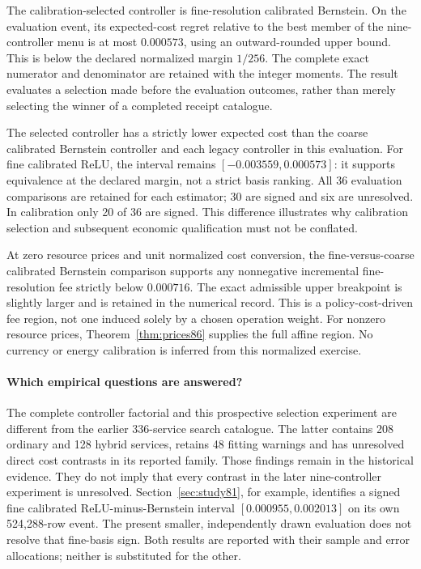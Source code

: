 

The calibration-selected controller is fine-resolution calibrated Bernstein. On the evaluation event, its expected-cost regret relative to the best member of the nine-controller menu is at most $0.000573$, using an outward-rounded upper bound. This is below the declared normalized margin $1/256$. The complete exact numerator and denominator are retained with the integer moments. The result evaluates a selection made before the evaluation outcomes, rather than merely selecting the winner of a completed receipt catalogue.

The selected controller has a strictly lower expected cost than the coarse calibrated Bernstein controller and each legacy controller in this evaluation. For fine calibrated ReLU, the interval remains $[-0.003559,0.000573]$: it supports equivalence at the declared margin, not a strict basis ranking. All 36 evaluation comparisons are retained for each estimator; 30 are signed and six are unresolved. In calibration only 20 of 36 are signed. This difference illustrates why calibration selection and subsequent economic qualification must not be conflated.

At zero resource prices and unit normalized cost conversion, the fine-versus-coarse calibrated Bernstein comparison supports any nonnegative incremental fine-resolution fee strictly below $0.000716$. The exact admissible upper breakpoint is slightly larger and is retained in the numerical record. This is a policy-cost-driven fee region, not one induced solely by a chosen operation weight. For nonzero resource prices, Theorem~\ref{thm:prices86} supplies the full affine region. No currency or energy calibration is inferred from this normalized exercise.

\paragraph{Which empirical questions are answered?}
The complete controller factorial and this prospective selection experiment are different from the earlier 336-service search catalogue. The latter contains 208 ordinary and 128 hybrid services, retains 48 fitting warnings and has unresolved direct cost contrasts in its reported family. Those findings remain in the historical evidence. They do not imply that every contrast in the later nine-controller experiment is unresolved. Section~\ref{sec:study81}, for example, identifies a signed fine calibrated ReLU-minus-Bernstein interval $[0.000955,0.002013]$ on its own 524,288-row event. The present smaller, independently drawn evaluation does not resolve that fine-basis sign. Both results are reported with their sample and error allocations; neither is substituted for the other.


